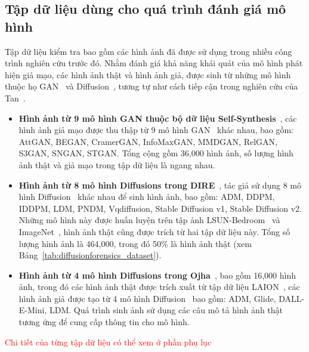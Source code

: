 

\subsection{Tập dữ liệu dùng cho quá trình đánh giá mô hình}
%
Tập dữ liệu kiểm tra bao gồm các hình ảnh đã được sử dụng trong nhiều công trình nghiên cứu trước đó. Nhằm đánh giá khả năng khái quát của mô hình phát hiện giả mạo,
%
các hình ảnh thật và hình ảnh giả, được sinh từ những mô hình thuộc họ GAN~\cite{Goodfellow2014GenerativeAN} và Diffusion~\cite{Ho2020DenoisingDP}, tương tự như cách tiếp cận trong nghiên cứu của Tan~\cite{Tan2023RethinkingTU}.
%
%
\begin{itemize}
	\item \textbf{Hình ảnh từ 9 mô hình GAN thuộc bộ dữ liệu Self-Synthesis}~\cite{Tan2023RethinkingTU}, các hình ảnh giả mạo được thu thập từ 9 mô hình GAN~\cite{Goodfellow2014GenerativeAN} khác nhau, bao gồm:
	AttGAN, BEGAN, CramerGAN, InfoMaxGAN, MMDGAN, RelGAN, S3GAN, SNGAN, STGAN. 
	Tổng cộng gồm 36,000 hình ảnh, số lượng hình ảnh thật và giả mạo trong tập dữ liệu là ngang nhau.
	\item \textbf{Hình ảnh từ 8 mô hình Diffusions trong DIRE}~\cite{Wang2023DIREFD}, tác giả sử dụng 8 mô hình Diffusion~\cite{Ho2020DenoisingDP} khác nhau để sinh hình ảnh, bao gồm:
	ADM, DDPM, IDDPM, LDM, PNDM,  Vqdiffusion, Stable Diffusion v1, Stable Diffusion v2.
	Những mô hình này được huấn luyện trên tập ảnh LSUN-Bedroom~\cite{Yu2015LSUNCO} và ImageNet~\cite{5206848}, hình ảnh thật cũng được trích từ hai tập dữ liệu này. Tổng số lượng hình ảnh là 464,000, trong đó 50\% là hình ảnh thật (xem Bảng~\ref{tab:diffusionforensics_dataset}).
	\item \textbf{Hình ảnh từ 4 mô hình Diffusions trong Ojha}~\cite{Ojha2023TowardsUF}, bao gồm 16,000 hình ảnh, trong đó các hình ảnh thật được trích xuất từ tập dữ liệu LAION~\cite{abs-2111-02114}, các hình ảnh giả được tạo từ 4 mô hình Diffusion~\cite{Ho2020DenoisingDP} bao gồm:
	ADM, Glide,  DALL-E-Mini, LDM.
	Quá trình sinh ảnh sử dụng các câu mô tả hình ảnh thật tương ứng để cung cấp thông tin cho mô hình.
\end{itemize}

\textcolor{red}{Chi tiết của từng tập dữ liệu có thể xem ở phần phụ lục}

